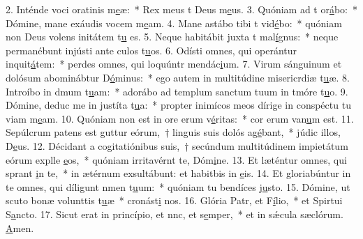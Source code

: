 2. Inténde voci oratinis m\uline{e}æ:~* Rex meus t Deus m\uline{e}us.
3. Quóniam ad t or\uline{á}bo:~* Dómine, mane exáudis vocem m\uline{e}am.
4. Mane astábo tibi t vid\uline{é}bo:~* quóniam non Deus volens initátem t\uline{u} es.
5. Neque habitábit juxta t mal\uline{í}gnus:~* neque permanébunt injústi ante culos t\uline{u}os.
6. Odísti omnes, qui operántur inquit\uline{á}tem:~* perdes omnes, qui loquúntr mendác\uline{i}um.
7. Virum sánguinum et dolósum abominábtur D\uline{ó}minus:~* ego autem in multitúdine misericrdiæ t\uline{u}æ.
8. Introíbo in dmum t\uline{u}am:~* adorábo ad templum sanctum tuum in tmóre t\uline{u}o.
9. Dómine, deduc me in justíta t\uline{u}a:~* propter inimícos meos dírige in conspéctu tu viam m\uline{e}am.
10. Quóniam non est in ore erum v\uline{é}ritas:~* cor erum van\uline{u}m est.
11. Sepúlcrum patens est guttur eórum,~† linguis suis dolós ag\uline{é}bant,~* júdic illos, D\uline{e}us.
12. Décidant a cogitatiónibus suis,~† secúndum multitúdinem impietátum eórum explle \uline{e}os,~* quóniam irritavérnt te, Dóm\uline{i}ne.
13. Et læténtur omnes, qui sprant \uline{i}n te,~* in ætérnum exsultábunt: et habitbis in \uline{e}is.
14. Et gloriabúntur in te omnes, qui díligunt nmen t\uline{u}um:~* quóniam tu bendíces j\uline{u}sto.
15. Dómine, ut scuto bonæ volunttis t\uline{u}æ~* cronást\uline{i} nos.
16. Glória Patr, et F\uline{í}lio,~* et Spirtui S\uline{a}ncto.
17. Sicut erat in princípio, et nnc, et s\uline{e}mper,~* et in sǽcula sæclórum. \uline{A}men.
